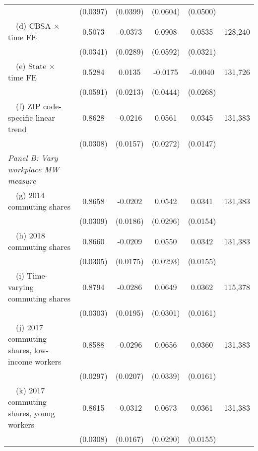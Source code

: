 \begin{landscape}
\begin{table}[ht!]
\begin{tabular}{@{}lccccc@{}}
                                                             & (0.0397) & (0.0399) & (0.0604) & (0.0500) &      \\
        $\quad$(d) CBSA $\times$ time FE                     &  0.5073  &  -0.0373  &  0.0908  &  0.0535  & 128,240 \\
                                                             & (0.0341) & (0.0289) & (0.0592) & (0.0321) &      \\
        $\quad$(e) State $\times$ time FE                    &  0.5284  &  0.0135  &  -0.0175  &  -0.0040  & 131,726 \\
                                                             & (0.0591) & (0.0213) & (0.0444) & (0.0268) &      \\
        $\quad$(f) ZIP code-specific linear trend            &  0.8628  &  -0.0216  &  0.0561  &  0.0345  & 131,383 \\
                                                             & (0.0308) & (0.0157) & (0.0272) & (0.0147) &      \\
        \textit{Panel B: Vary workplace MW measure}          &       &       &       &       &      \\
        $\quad$(g) 2014 commuting shares                     &  0.8658  &  -0.0202  &  0.0542  &  0.0341  & 131,383 \\
                                                             & (0.0309) & (0.0186) & (0.0296) & (0.0154) &      \\
        $\quad$(h) 2018 commuting shares                     &  0.8660  &  -0.0209  &  0.0550  &  0.0342  & 131,383 \\
                                                             & (0.0305) & (0.0175) & (0.0293) & (0.0155) &      \\
        $\quad$(i) Time-varying commuting shares             &  0.8794  &  -0.0286  &  0.0649  &  0.0362  & 115,378 \\
                                                             & (0.0303) & (0.0195) & (0.0301) & (0.0161) &      \\
        $\quad$(j) 2017 commuting shares, low-income workers &  0.8588  &  -0.0296  &  0.0656  &  0.0360  & 131,383 \\
                                                             & (0.0297) & (0.0207) & (0.0339) & (0.0161) &      \\
        $\quad$(k) 2017 commuting shares, young workers      &  0.8615  &  -0.0312  &  0.0673  &  0.0361  & 131,383 \\
                                                             & (0.0308) & (0.0167) & (0.0290) & (0.0155) &      \\ \bottomrule
    \end{tabular}


\end{table}
\end{landscape}
